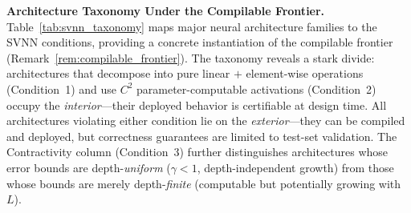 \vspace{4pt}
\noindent\textbf{Architecture Taxonomy Under the Compilable Frontier.}
Table~\ref{tab:svnn_taxonomy} maps major neural architecture families to the
SVNN conditions, providing a concrete instantiation of the compilable frontier
(Remark~\ref{rem:compilable_frontier}). The taxonomy reveals a stark divide:
architectures that decompose into pure linear $+$ element-wise operations
(Condition~1) and use $C^2$ parameter-computable activations (Condition~2)
occupy the \textit{interior}---their deployed behavior is certifiable at design
time. All architectures violating either condition lie on the
\textit{exterior}---they can be compiled and deployed, but correctness
guarantees are limited to test-set validation. The Contractivity column
(Condition~3) further distinguishes architectures whose error bounds are
depth-\textit{uniform} ($\gamma < 1$, depth-independent growth) from those whose bounds
are merely depth-\textit{finite} (computable but potentially growing with $L$).

